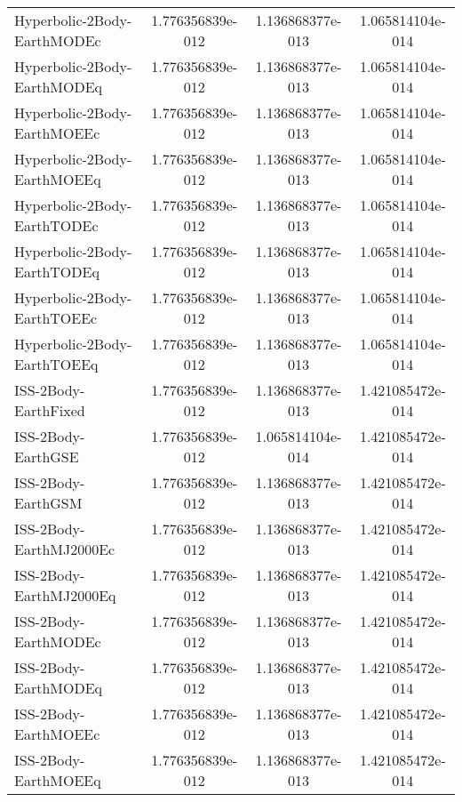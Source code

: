 \begin{table}[htbp!]
\begin{tabular}{lccc}
         Hyperbolic-2Body-EarthMODEc & 1.776356839e-012 & 1.136868377e-013 & 1.065814104e-014 \\
         Hyperbolic-2Body-EarthMODEq & 1.776356839e-012 & 1.136868377e-013 & 1.065814104e-014 \\
         Hyperbolic-2Body-EarthMOEEc & 1.776356839e-012 & 1.136868377e-013 & 1.065814104e-014 \\
         Hyperbolic-2Body-EarthMOEEq & 1.776356839e-012 & 1.136868377e-013 & 1.065814104e-014 \\
         Hyperbolic-2Body-EarthTODEc & 1.776356839e-012 & 1.136868377e-013 & 1.065814104e-014 \\
         Hyperbolic-2Body-EarthTODEq & 1.776356839e-012 & 1.136868377e-013 & 1.065814104e-014 \\
         Hyperbolic-2Body-EarthTOEEc & 1.776356839e-012 & 1.136868377e-013 & 1.065814104e-014 \\
         Hyperbolic-2Body-EarthTOEEq & 1.776356839e-012 & 1.136868377e-013 & 1.065814104e-014 \\
         ISS-2Body-EarthFixed & 1.776356839e-012 & 1.136868377e-013 & 1.421085472e-014 \\
         ISS-2Body-EarthGSE & 1.776356839e-012 & 1.065814104e-014 & 1.421085472e-014 \\
         ISS-2Body-EarthGSM & 1.776356839e-012 & 1.136868377e-013 & 1.421085472e-014 \\
         ISS-2Body-EarthMJ2000Ec & 1.776356839e-012 & 1.136868377e-013 & 1.421085472e-014 \\
         ISS-2Body-EarthMJ2000Eq & 1.776356839e-012 & 1.136868377e-013 & 1.421085472e-014 \\
         ISS-2Body-EarthMODEc & 1.776356839e-012 & 1.136868377e-013 & 1.421085472e-014 \\
         ISS-2Body-EarthMODEq & 1.776356839e-012 & 1.136868377e-013 & 1.421085472e-014 \\
         ISS-2Body-EarthMOEEc & 1.776356839e-012 & 1.136868377e-013 & 1.421085472e-014 \\
         ISS-2Body-EarthMOEEq & 1.776356839e-012 & 1.136868377e-013 & 1.421085472e-014 \\

\end{tabular}
\end{table}
